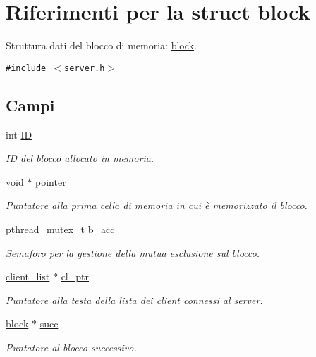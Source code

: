 \hypertarget{structblock}{
\section{Riferimenti per la struct block}
\label{structblock}
}
Struttura dati del blocco di memoria: \hyperlink{structblock}{block}.  


{\tt \#include $<$server.h$>$}

\subsection*{Campi}
\begin{CompactItemize}
\item 
int \hyperlink{structblock_c56acfb3538cc5823dc0223f812f87ce_c56acfb3538cc5823dc0223f812f87ce}{ID}
\begin{CompactList}\small\item\em ID del blocco allocato in memoria. \item\end{CompactList}\item 
void $\ast$ \hyperlink{structblock_bcf5e0be544c8d79ef9037ecfb46bb4c_bcf5e0be544c8d79ef9037ecfb46bb4c}{pointer}
\begin{CompactList}\small\item\em Puntatore alla prima cella di memoria in cui è memorizzato il blocco. \item\end{CompactList}\item 
pthread\_\-mutex\_\-t \hyperlink{structblock_36a983c8b5ed4f991ed2be58cebb506e_36a983c8b5ed4f991ed2be58cebb506e}{b\_\-acc}
\begin{CompactList}\small\item\em Semaforo per la gestione della mutua esclusione sul blocco. \item\end{CompactList}\item 
\hyperlink{structclient__list}{client\_\-list} $\ast$ \hyperlink{structblock_8fdcef9d38100ca24b13bd7d90efe54f_8fdcef9d38100ca24b13bd7d90efe54f}{cl\_\-ptr}
\begin{CompactList}\small\item\em Puntatore alla testa della lista dei client connessi al server. \item\end{CompactList}\item 
\hyperlink{structblock}{block} $\ast$ \hyperlink{structblock_820194802c67def63d15586d5d9e5fe6_820194802c67def63d15586d5d9e5fe6}{succ}
\begin{CompactList}\small\item\em Puntatore al blocco successivo. \item\end{CompactList}\end{CompactItemize}


